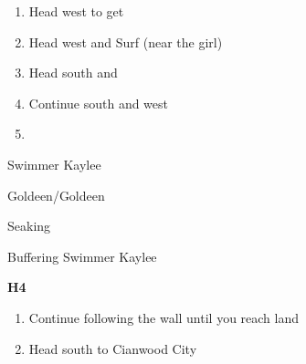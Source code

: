 \begin{paracol}{2}
\begin{enumerate}[resume]
	\item Head west to get 
	\item Head west and Surf (near the girl)
	\item Head south and 
	\item Continue south and west
	\item {}
\end{enumerate}

\switchcolumn*
\begin{trainer}{Swimmer Kaylee}
	\varwb
	\begin{fightSection}{Goldeen/Goldeen}
		\item {} \strength{} 
	\end{fightSection}
	\begin{fightSection}{Seaking}
		\item {} \headbutt
		\item {} \bite
	\end{fightSection}
	\varwe
\end{trainer}

\switchcolumn
\begin{menu}{Buffering Swimmer Kaylee}
	\varwb
	\begin{packMenu}
		\item \menuHlTwo{(\pointLeft{})} \textbf{H4 \strength{}} \switch{} \waterGun{} 
	\end{packMenu}
	\varwe
\end{menu}

\begin{enumerate}[resume]
	\item Continue following the wall until you reach land
	\item Head south to Cianwood City
\end{enumerate}

\end{paracol}
\vspace{3.5mm}